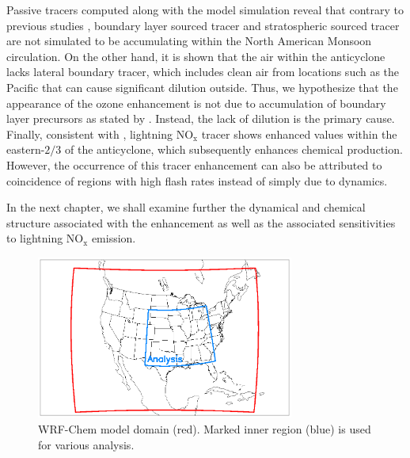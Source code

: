 Passive tracers computed along with the model simulation reveal that
contrary to previous studies \citep[e.g.][]{Li:2005ss,Cooper:2007cr,Barth:2012qf},
boundary layer sourced tracer and stratospheric sourced tracer are not simulated
to be accumulating within the North American Monsoon circulation. On the other
hand, it is shown that the air within the anticyclone lacks lateral boundary tracer,
which includes clean air from locations such as the Pacific that can cause significant
dilution outside. Thus, we hypothesize that the appearance of the ozone
enhancement is not due to accumulation of boundary layer precursors as
stated by \citet{Li:2005ss}. Instead, the lack of dilution is the primary cause. Finally,
consistent with \citet{Cooper:2007cr}, lightning NO$_{\mathrm{x}}$ tracer shows enhanced values
within the eastern-$2/3$ of the anticyclone, which subsequently enhances
chemical production. However, the occurrence of this tracer enhancement
can also be attributed to coincidence of regions with high flash rates instead
of simply due to dynamics.

In the next chapter, we shall examine further the dynamical and chemical
structure associated with the enhancement as well as the associated sensitivities
to lightning NO$_{\mathrm{x}}$ emission.

 \begin{figure}
 \noindent\includegraphics[width=20pc]{figures/domain.eps} %
 \caption{WRF-Chem model domain (red). Marked inner region (blue) is used for various analysis.}
 \label{fig:domain}
 \end{figure}

